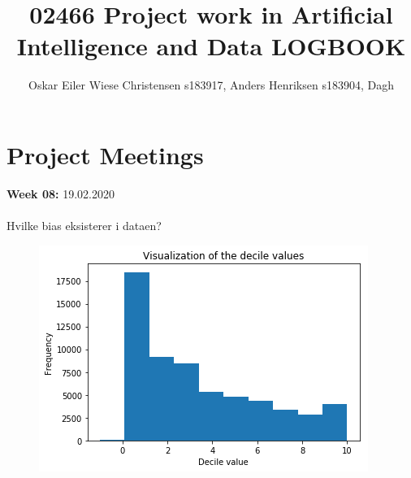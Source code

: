 \documentclass[11pt, fleqn]{article}
\title{02466 Project work in Artificial Intelligence and Data LOGBOOK}
\author{Oskar Eiler Wiese Christensen s183917, Anders Henriksen s183904, Dagh}
\begin{document}
	\maketitle
		
\section*{Project Meetings}
	
	
	\textbf{Week 08:}  19.02.2020 \\\\
	\noindent
	Hvilke bias eksisterer i dataen? \\ 
	\begin{figure}[H]
		\centering
		\includegraphics[width=0.3\linewidth]{billeder/decil.png}
	\end{figure}
\end{document}
